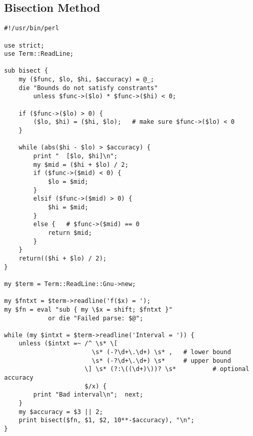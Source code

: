 \documentclass[12pt]{article}
\begin{document}
\subsection*{Bisection Method}
\begin{verbatim}
#!/usr/bin/perl

use strict;
use Term::ReadLine;

sub bisect {
    my ($func, $lo, $hi, $accuracy) = @_;
    die "Bounds do not satisfy constrants"
        unless $func->($lo) * $func->($hi) < 0;

    if ($func->($lo) > 0) {
        ($lo, $hi) = ($hi, $lo);   # make sure $func->($lo) < 0
    }

    while (abs($hi - $lo) > $accuracy) {
        print "  [$lo, $hi]\n";
        my $mid = ($hi + $lo) / 2;
        if ($func->($mid) < 0) {
            $lo = $mid;
        }
        elsif ($func->($mid) > 0) {
            $hi = $mid;
        }
        else {   # $func->($mid) == 0
            return $mid;
        }
    }
    return(($hi + $lo) / 2);
}

my $term = Term::ReadLine::Gnu->new;

my $fntxt = $term->readline('f($x) = ');
my $fn = eval "sub { my \$x = shift; $fntxt }"
            or die "Failed parse: $@";

while (my $intxt = $term->readline('Interval = ')) {
    unless ($intxt =~ /^ \s* \[
                        \s* (-?\d+\.\d+) \s* ,   # lower bound
                        \s* (-?\d+\.\d+) \s*     # upper bound
                      \] \s* (?:\((\d+)\))? \s*          # optional accuracy
                      $/x) {
        print "Bad interval\n";  next;
    }
    my $accuracy = $3 || 2;
    print bisect($fn, $1, $2, 10**-$accuracy), "\n";
}
\end{verbatim}
\end{document}
